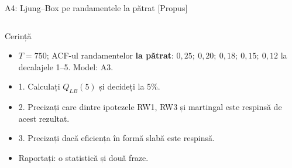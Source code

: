 \begin{frame}{A4: Ljung--Box pe randamentele la pătrat [Propus]}
\propsub
\itemsize{\scriptsize}
\begin{columns}[T]
\begin{column}{\taskw}
\begin{block}{Cerință}
\begin{itemize}
    \item $T = 750$; ACF-ul randamentelor \textbf{la pătrat}: $0{,}25;\ 0{,}20;\ 0{,}18;\ 0{,}15;\ 0{,}12$ la decalajele 1--5. Model: A3.
    \item 1. Calculați $Q_{LB}(5)$ și decideți la 5\%.
    \item 2. Precizați care dintre ipotezele RW1, RW3 și martingal este respinsă de acest rezultat.
    \item 3. Precizați dacă eficiența în formă slabă este respinsă.
    \item Raportați: o statistică și două fraze.
\end{itemize}
\end{block}
\end{column}
\begin{column}{\solw}
\end{column}
\end{columns}
\end{frame}

